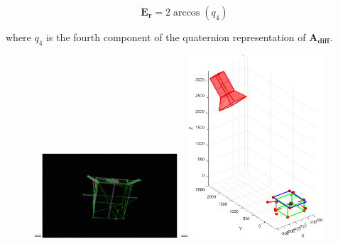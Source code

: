 \begin{equation}
  \mathbf{E_r} = 2 \arccos\left({q_4}\right)
\end{equation}

where $q_4$ is the fourth component of the quaternion representation of $\mathbf{A_{diff}}$.

\begin{figure}[htpb]
  =\hbox{\includegraphics[width=0.45\textwidth]{gfx/PoseDetermination/trial49modelMap.eps}}%
  =\hbox{\includegraphics[width=0.45\textwidth]{gfx/PoseDetermination/cameraWRTSC49.eps}}%
  {\,} \hfill
   \hfill
   \hfill

\end{figure}

